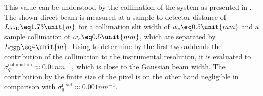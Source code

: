 \documentclass[\main/dresen_thesis.tex]{subfiles}
\begin{document}
    This value can be understood by the collimation of the system as presented in .
    The shown direct beam is measured at a sample-to-detector distance of $L_\mathrm{SSD} \eq 1.73 \unit{m}$ for a collimation slit width of $w_c \eq 0.5 \unit{mm}$ and a sample collimation of $w_s \eq 0.5 \unit{mm}$, which are separated by $L_\mathrm{CSD} \eq 4 \unit{m}$.
    Using  to determine by the first two addends the contribution of the collimation to the instrumental resolution, it is evaluated to $\sigma_q^\mathrm{collimation} \approx 0.01 \unit{nm^{-1}}$, which is close to the Gaussian beam width.
    The contribution by the finite size of the pixel is on the other hand negligible in comparison with $\sigma_q^\mathrm{pixel} \approx 0.001 \unit{nm^{-1}}$.
\end{document}
